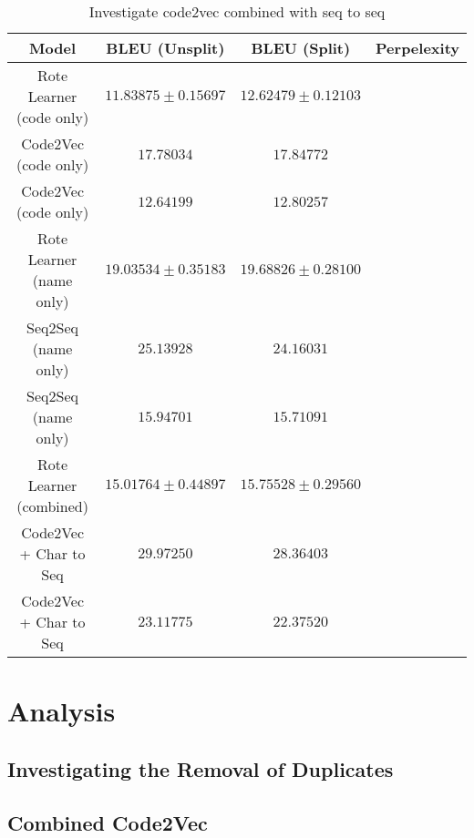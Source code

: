 \begin{table}[h!]
\begin{center}
\begin{tabular}{ c | c | c | c }
    Model                             & BLEU (Unsplit)  & BLEU (Split)    & Perpelexity \\
    \hline
    Rote Learner  (code only)        & $ 11.83875 \pm  0.15697 $ & $ 12.62479 \pm 0.12103 $ & \\
    Code2Vec  (code only)             & $ 17.78034 $ & $ 17.84772 $ & \\
    \hdashline
    Code2Vec  (code only)             & $ 12.64199 $ & $ 12.80257 $ & \\
    \hline
    \hline
    Rote Learner  (name only)         & $ 19.03534 \pm  0.35183 $ & $ 19.68826 \pm 0.28100 $ & \\
    Seq2Seq  (name only)              & $ 25.13928 $ & $ 24.16031 $ & \\
    \hdashline
    Seq2Seq  (name only)              & $ 15.94701 $ & $ 15.71091 $ & \\
    \hline
    \hline
    Rote Learner (combined)            & $ 15.01764 \pm  0.44897 $ & $ 15.75528 \pm 0.29560 $ & \\
    Code2Vec  + Char to Seq           & $ 29.97250 $ & $ 28.36403 $ & \\
    \hdashline
    Code2Vec  + Char to Seq           & $ 23.11775 $ & $ 22.37520 $ & \\
    \hline
\end{tabular}
\caption {Investigate code2vec combined with seq to seq}
\label{table:code2vec_embed}
\end{center}
\end{table}





\section{Analysis} %
\label{sec:analysis}


\subsection{Investigating the Removal of Duplicates} %
\label{sub:investigating_the_removal_of_duplicates}

\subsection{Combined Code2Vec } %
\label{sub:combined_code2vec}

